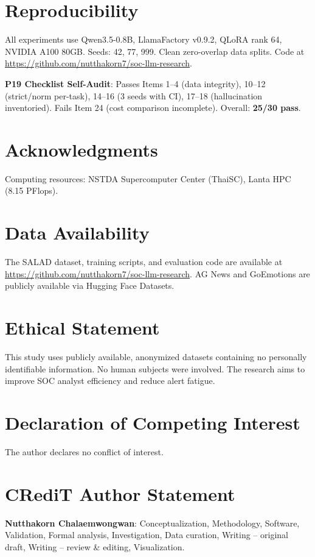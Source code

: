 \documentclass[review,3p]{elsarticle}
\begin{document}
\section*{Reproducibility}
All experiments use Qwen3.5-0.8B, LlamaFactory v0.9.2, QLoRA rank 64, NVIDIA A100 80GB. Seeds: 42, 77, 999. Clean zero-overlap data splits. Code at \url{https://github.com/nutthakorn7/soc-llm-research}.

\noindent\textbf{P19 Checklist Self-Audit}: Passes Items 1--4 (data integrity), 10--12 (strict/norm per-task), 14--16 (3 seeds with CI), 17--18 (hallucination inventoried). Fails Item 24 (cost comparison incomplete). Overall: \textbf{25/30 pass}.

\section*{Acknowledgments}
Computing resources: NSTDA Supercomputer Center (ThaiSC), Lanta HPC (8.15 PFlops).


\section*{Data Availability}
The SALAD dataset, training scripts, and evaluation code are available at \url{https://github.com/nutthakorn7/soc-llm-research}. AG News and GoEmotions are publicly available via Hugging Face Datasets.

\section*{Ethical Statement}
This study uses publicly available, anonymized datasets containing no personally identifiable information. No human subjects were involved. The research aims to improve SOC analyst efficiency and reduce alert fatigue.

\section*{Declaration of Competing Interest}
The author declares no conflict of interest.

\section*{CRediT Author Statement}
\textbf{Nutthakorn Chalaemwongwan}: Conceptualization, Methodology, Software, Validation, Formal analysis, Investigation, Data curation, Writing -- original draft, Writing -- review \& editing, Visualization.
\end{document}
